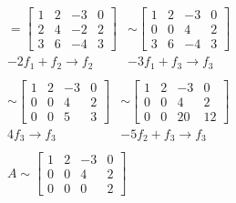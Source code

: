 	\begin{align*}
		&\begin{array} {c}
			=\begin{bmatrix}
				1 & 2 & -3 & 0 \\
				2 & 4 & -2 & 2 \\
				3 & 6 & -4 & 3
			\end{bmatrix} \\
			-2f_1+f_2\rightarrow f_2
		\end{array}
		\begin{array} {c}
			\sim\begin{bmatrix}
				1 & 2 & -3 & 0 \\
				0 & 0 & 4 & 2 \\
				3 & 6 & -4 & 3
			\end{bmatrix} \\
			-3f_1+f_3\rightarrow f_3
		\end{array} \\
		&\begin{array} {c}
			\sim\begin{bmatrix}
				1 & 2 & -3 & 0 \\
				0 & 0 & 4 & 2 \\
				0 & 0 & 5 & 3
			\end{bmatrix} \\
			4f_3\rightarrow f_3
		\end{array}
		\begin{array} {c}
			\sim\begin{bmatrix}
				1 & 2 & -3 & 0 \\
				0 & 0 & 4 & 2 \\
				0 & 0 & 20 & 12
			\end{bmatrix} \\
			-5f_2+f_3\rightarrow f_3
		\end{array} \\
		&\begin{array} {c}
			A\sim\begin{bmatrix}
				1 & 2 & -3 & 0 \\
				0 & 0 & 4 & 2 \\
				0 & 0 & 0 & 2
			\end{bmatrix}
		\end{array}
	\end{align*}
\hspace*{\fill}\colorbox{gray!55}{ } \\
